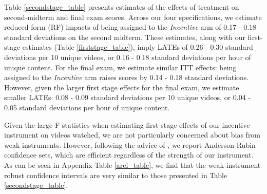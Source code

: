 \documentclass[12pt]{article}
\begin{document}
Table \ref{secondstage_table} presents estimates of the effects of treatment on second-midterm and final exam scores. Across our four specifications, we estimate reduced-form (RF) impacts of being assigned to the \textit{Incentive} arm of 0.17 - 0.18 standard deviations on the second midterm. These estimates, along with our first-stage estimates (Table \ref{firststage_table}), imply LATEs of 0.26 - 0.30 standard deviations per 10 unique videos, or 0.16 - 0.18 standard deviations per hour of unique content. For the final exam, we estimate similar ITT effects: being assigned to the \textit{Incentive} arm raises scores by 0.14 - 0.18 standard deviations. However, given the larger first stage effects for the final exam, we estimate smaller LATEs: 0.08 - 0.09 standard deviations per 10 unique videos, or 0.04 - 0.05 standard deviations per hour of unique content.

Given the large F-statistics when estimating first-stage effects of our incentive instrument on videos watched, we are not particularly concerned about bias from weak instruments. However, following the advice of \textcite{ass2019}, we report Anderson-Rubin confidence sets, which are efficient regardless of the strength of our instrument. As can be seen in Appendix Table \ref{arci_table}, we find that the weak-instrument-robust confidence intervals are very similar to those presented in Table \ref{secondstage_table}.
\end{document}

